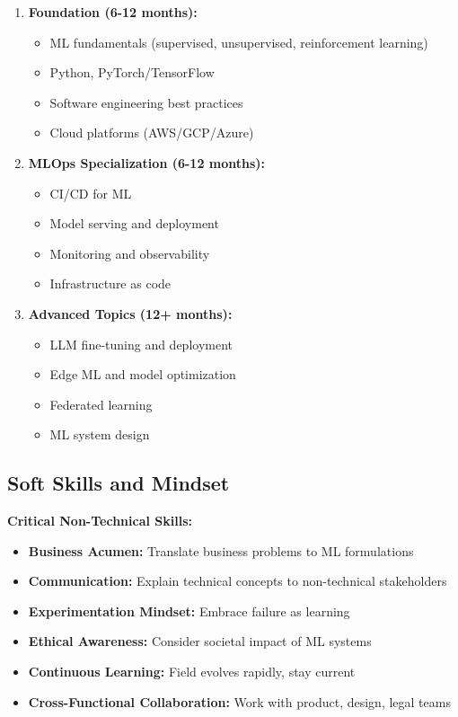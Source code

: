 \begin{enumerate}
    \item \textbf{Foundation (6-12 months):}
    \begin{itemize}
        \item ML fundamentals (supervised, unsupervised, reinforcement learning)
        \item Python, PyTorch/TensorFlow
        \item Software engineering best practices
        \item Cloud platforms (AWS/GCP/Azure)
    \end{itemize}

    \item \textbf{MLOps Specialization (6-12 months):}
    \begin{itemize}
        \item CI/CD for ML
        \item Model serving and deployment
        \item Monitoring and observability
        \item Infrastructure as code
    \end{itemize}

    \item \textbf{Advanced Topics (12+ months):}
    \begin{itemize}
        \item LLM fine-tuning and deployment
        \item Edge ML and model optimization
        \item Federated learning
        \item ML system design
    \end{itemize}
\end{enumerate}

\subsection{Soft Skills and Mindset}

\textbf{Critical Non-Technical Skills:}

\begin{itemize}
    \item \textbf{Business Acumen:} Translate business problems to ML formulations
    \item \textbf{Communication:} Explain technical concepts to non-technical stakeholders
    \item \textbf{Experimentation Mindset:} Embrace failure as learning
    \item \textbf{Ethical Awareness:} Consider societal impact of ML systems
    \item \textbf{Continuous Learning:} Field evolves rapidly, stay current
    \item \textbf{Cross-Functional Collaboration:} Work with product, design, legal teams
\end{itemize}

